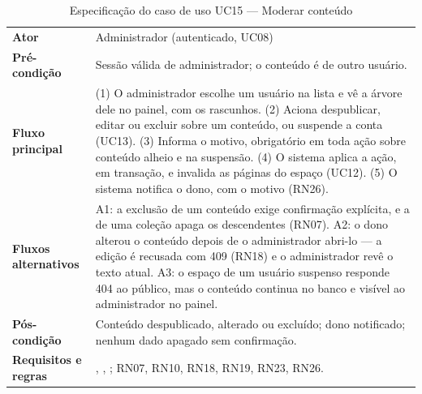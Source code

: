 \begin{table}[htb]
\caption{Especificação do caso de uso UC15 --- Moderar conteúdo}\label{tab:uc15}
\small
\begin{tabularx}{\linewidth}{@{}L{3.0cm}Y@{}}
\toprule
\textbf{Ator} & Administrador (autenticado, UC08)\\
\textbf{Pré-condição} & Sessão válida de administrador; o conteúdo é de outro usuário.\\
\textbf{Fluxo principal} & (1) O administrador escolhe um usuário na lista e vê a árvore dele no painel, com os rascunhos. (2) Aciona despublicar, editar ou excluir sobre um conteúdo, ou suspende a conta (UC13). (3) Informa o motivo, obrigatório em toda ação sobre conteúdo alheio e na suspensão. (4) O sistema aplica a ação, em transação, e invalida as páginas do espaço (UC12). (5) O sistema notifica o dono, com o motivo (RN26).\\
\textbf{Fluxos alternativos} & A1: a exclusão de um conteúdo exige confirmação explícita, e a de uma coleção apaga os descendentes (RN07). A2: o dono alterou o conteúdo depois de o administrador abri-lo --- a edição é recusada com 409  (RN18) e o administrador revê o texto atual. A3: o espaço de um usuário suspenso responde 404 ao público, mas o conteúdo continua no banco e visível ao administrador no painel.\\
\textbf{Pós-condição} & Conteúdo despublicado, alterado ou excluído; dono notificado; nenhum dado apagado sem confirmação.\\
\textbf{Requisitos e regras} & , , ; RN07, RN10, RN18, RN19, RN23, RN26.\\
\bottomrule
\end{tabularx}
\end{table}

